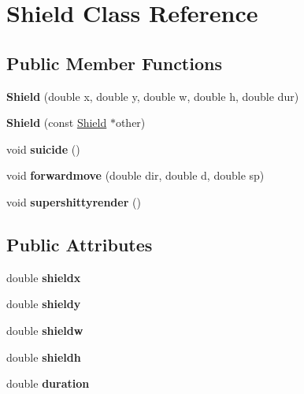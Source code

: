 \hypertarget{classShield}{\section{Shield Class Reference}
\label{classShield}
}
\subsection*{Public Member Functions}
\begin{DoxyCompactItemize}
\item 
\hypertarget{classShield_a49c48243d5c649375ed9f9350c87c60e}{{\bfseries Shield} (double x, double y, double w, double h, double dur)}\label{classShield_a49c48243d5c649375ed9f9350c87c60e}

\item 
\hypertarget{classShield_a2370d6c1606b23caaf56813c661977b8}{{\bfseries Shield} (const \hyperlink{classShield}{Shield} $\ast$other)}\label{classShield_a2370d6c1606b23caaf56813c661977b8}

\item 
\hypertarget{classShield_a1be2aa0aa835b8a4a219b98d26f14523}{void {\bfseries suicide} ()}\label{classShield_a1be2aa0aa835b8a4a219b98d26f14523}

\item 
\hypertarget{classShield_a0451652270da3fa92be309b896b9acfe}{void {\bfseries forwardmove} (double dir, double d, double sp)}\label{classShield_a0451652270da3fa92be309b896b9acfe}

\item 
\hypertarget{classShield_a3eb86eabe19b902e2a9af4d68ed220ba}{void {\bfseries supershittyrender} ()}\label{classShield_a3eb86eabe19b902e2a9af4d68ed220ba}

\end{DoxyCompactItemize}
\subsection*{Public Attributes}
\begin{DoxyCompactItemize}
\item 
\hypertarget{classShield_a19db049d276a48b7a0f9f4791fe5c89b}{double {\bfseries shieldx}}\label{classShield_a19db049d276a48b7a0f9f4791fe5c89b}

\item 
\hypertarget{classShield_ad5d663f736d3544cb6897794a86557c9}{double {\bfseries shieldy}}\label{classShield_ad5d663f736d3544cb6897794a86557c9}

\item 
\hypertarget{classShield_ab4123e279a094c17148bb8b03fe66327}{double {\bfseries shieldw}}\label{classShield_ab4123e279a094c17148bb8b03fe66327}

\item 
\hypertarget{classShield_a61a4b600c5c1db10c5db1a0c0de35873}{double {\bfseries shieldh}}\label{classShield_a61a4b600c5c1db10c5db1a0c0de35873}

\item 
\hypertarget{classShield_a53c9607a9f2cef4c16b04bfa02c6d2bf}{double {\bfseries duration}}\label{classShield_a53c9607a9f2cef4c16b04bfa02c6d2bf}

\end{DoxyCompactItemize}


